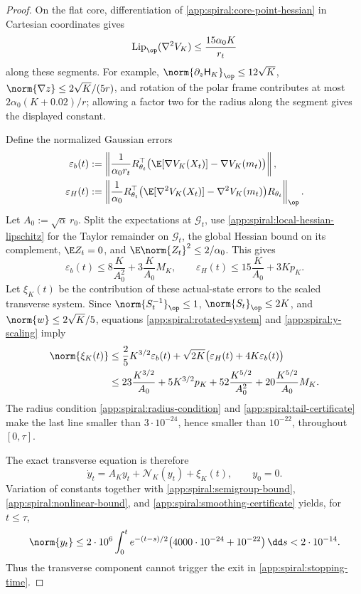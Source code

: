 \begin{proof}
On the flat core, differentiation of
\eqref{app:spiral:core-point-hessian} in Cartesian coordinates gives
\begin{equation}
\label{app:spiral:local-hessian-lipschitz}
 \operatorname{Lip}_{\op}(\nabla^2V_K)
 \leq\frac{15\alpha_0K}{r_t}
\end{equation}
along these segments.  For example,
\(\norm{\partial_z\mathsf H_K}_{\op}\leq12\sqrt K\),
\(\norm{\nabla z}\leq2\sqrt K/(5r)\), and rotation of the polar frame
contributes at most \(2\alpha_0(K+0.02)/r\); allowing a factor two for the
radius along the segment gives the displayed constant.

Define the normalized Gaussian errors
\begin{align*}
 \varepsilon_b(t)
 &:=\left\|\frac1{\alpha_0 r_t}R_{\theta_t}^\top
   \bigl(\E[\nabla V_K(X_t)]-\nabla V_K(m_t)\bigr)\right\|,\\
 \varepsilon_H(t)
 &:=\left\|\frac1{\alpha_0}R_{\theta_t}^\top
   \bigl(\E[\nabla^2V_K(X_t)]-\nabla^2V_K(m_t)\bigr)
   R_{\theta_t}\right\|_{\op}.
\end{align*}
Let \(A_0:=\sqrt\alpha\,r_0\).  Split the expectations at
\(\mathcal G_t\), use
\eqref{app:spiral:local-hessian-lipschitz} for the Taylor remainder on
\(\mathcal G_t\), the global Hessian bound on its complement,
\(\E Z_t=0\), and \(\E\norm{Z_t}^2\leq2/\alpha_0\).  This gives
\begin{equation}
\label{app:spiral:average-errors}
 \varepsilon_b(t)
 \leq8\frac K{A_0^2}+3\frac K{A_0}M_K,
 \qquad
 \varepsilon_H(t)
 \leq15\frac K{A_0}+3Kp_K.
\end{equation}
Let \(\xi_K(t)\) be the contribution of these actual-state errors to
the scaled transverse system.  Since
\(\norm{S_t^{-1}}_{\op}\leq1\),
\(\norm{S_t}_{\op}\leq2K\), and
\(\norm{w}\leq2\sqrt K/5\), equations
\eqref{app:spiral:rotated-system} and
\eqref{app:spiral:y-scaling} imply
\begin{align}
\label{app:spiral:smoothing-certificate}
 \norm{\xi_K(t)}
 &\leq\frac25K^{3/2}\varepsilon_b(t)
   +\sqrt{2K}\bigl(\varepsilon_H(t)+4K\varepsilon_b(t)\bigr)\notag\\
 &\leq23\frac{K^{3/2}}{A_0}
   +5K^{3/2}p_K
   +52\frac{K^{5/2}}{A_0^2}
   +20\frac{K^{5/2}}{A_0}M_K.
\end{align}
The radius condition \eqref{app:spiral:radius-condition} and
\eqref{app:spiral:tail-certificate} make the last line smaller than
\(3\cdot10^{-24}\), hence smaller than \(10^{-22}\), throughout
\([0,\tau]\).

The exact transverse equation is therefore
\begin{equation}
\label{app:spiral:transverse-system}
 \dot y_t=A_Ky_t+\mathcal N_K(y_t)+\xi_K(t),
 \qquad
 y_0=0.
\end{equation}
Variation of constants together with
\eqref{app:spiral:semigroup-bound},
\eqref{app:spiral:nonlinear-bound}, and
\eqref{app:spiral:smoothing-certificate} yields, for \(t\leq\tau\),
\[
 \norm{y_t}
 \leq2\cdot10^6\int_0^te^{-(t-s)/2}
 \bigl(4000\cdot10^{-24}+10^{-22}\bigr)\,\dd s
 <2\cdot10^{-14}.
\]
Thus the transverse component cannot trigger the exit in
\eqref{app:spiral:stopping-time}.


\end{proof}
